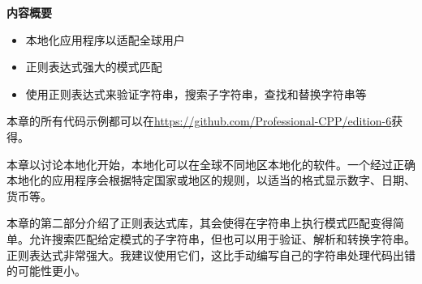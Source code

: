 \noindent
\textbf{内容概要}

\begin{itemize}
\item
本地化应用程序以适配全球用户

\item
正则表达式强大的模式匹配

\item
使用正则表达式来验证字符串，搜索子字符串，查找和替换字符串等
\end{itemize}

本章的所有代码示例都可以在\url{https://github.com/Professional-CPP/edition-6}获得。

本章以讨论本地化开始，本地化可以在全球不同地区本地化的软件。一个经过正确本地化的应用程序会根据特定国家或地区的规则，以适当的格式显示数字、日期、货币等。

本章的第二部分介绍了正则表达式库，其会使得在字符串上执行模式匹配变得简单。允许搜索匹配给定模式的子字符串，但也可以用于验证、解析和转换字符串。正则表达式非常强大。我建议使用它们，这比手动编写自己的字符串处理代码出错的可能性更小。
